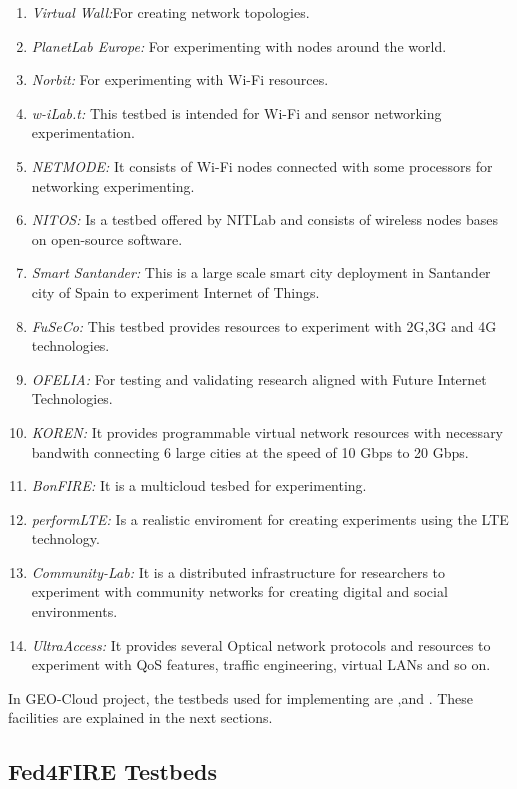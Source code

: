 \begin{enumerate}
\item \emph{Virtual Wall:}For creating network topologies. 
\item \emph{PlanetLab Europe:} For experimenting with nodes around the world.
\item \emph{Norbit:} For experimenting with Wi-Fi resources.
\item \emph{w-iLab.t:} This testbed is intended for Wi-Fi and sensor networking experimentation.
\item \emph{NETMODE:} It consists of Wi-Fi nodes connected with some processors
  for networking experimenting.
\item \emph{NITOS:} Is a testbed offered by NITLab and consists of wireless
  nodes bases on open-source software. 
\item \emph{Smart Santander:} This is a large scale smart city deployment in
  Santander city of Spain to experiment Internet of Things. 
\item \emph{FuSeCo:} This testbed provides resources to experiment with 2G,3G
  and 4G technologies.
\item \emph{OFELIA:} For testing and validating research aligned
  with Future Internet Technologies.
\item \emph{KOREN:} It provides programmable virtual network resources with
  necessary bandwith connecting 6 large cities at the speed of 10 Gbps to 20 Gbps. 
\item \emph{BonFIRE:} It is a multicloud tesbed for experimenting.
\item \emph{performLTE:} Is a realistic enviroment for creating experiments
  using the LTE technology.
\item \emph{Community-Lab:} It is a distributed infrastructure for researchers
  to experiment with community networks for creating digital and social environments.
\item \emph{UltraAccess:} It provides several Optical network protocols and
  resources to experiment with QoS features, traffic engineering, virtual LANs
  and so on.
\end{enumerate}

In GEO-Cloud project, the testbeds used for implementing are \vw,\pl and
\bonfire. These facilities are explained in the next sections.

\subsection{Fed4FIRE Testbeds}

